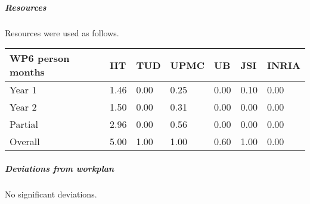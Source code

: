 

\subparagraph{Resources}

Resources were used as follows.

\begin{center}
\begin{tabular}{|C{1.5cm}|C{1.5cm}|C{1.5cm}|C{2cm}|C{2cm}|C{2cm}|C{2cm}|}
\hline
\footnotesize \textbf{WP6 person months}& \footnotesize \textbf{IIT}&\footnotesize \textbf{TUD}&\footnotesize \textbf{UPMC}& \footnotesize \textbf{UB} &\footnotesize \textbf{JSI} & \footnotesize \textbf{INRIA} \\ \hline
\footnotesize Year 1 &  1.46 & 0.00 & 0.25 & 0.00 & 0.10 & 0.00    \\  \hline
\footnotesize Year 2 &  1.50 & 0.00 & 0.31 & 0.00 & 0.00 & 0.00     \\  \hline
\footnotesize Partial &  2.96 & 0.00 & 0.56 & 0.00 & 0.00 & 0.00 \\ \hline \hline
\footnotesize Overall &  5.00 & 1.00 & 1.00 & 0.60 & 1.00 & 0.00 \\ \hline
\end{tabular}
\end{center}

\subparagraph{Deviations from workplan} 
No significant deviations. 